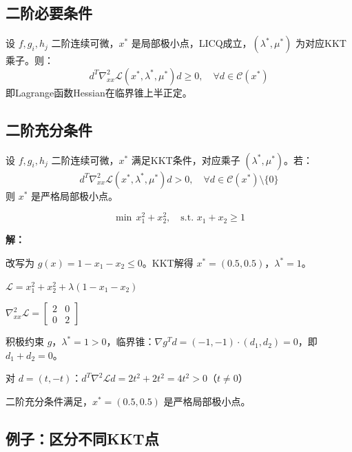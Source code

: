 \subsection{二阶必要条件}

\begin{theorem}[二阶必要条件]
设 $f, g_i, h_j$ 二阶连续可微，$x^*$ 是局部极小点，LICQ成立，$(\lambda^*, \mu^*)$ 为对应KKT乘子。则：
\[
d^T \nabla_{xx}^2 \mathcal{L}(x^*, \lambda^*, \mu^*) d \geq 0, \quad \forall d \in \mathcal{C}(x^*)
\]
即Lagrange函数Hessian在临界锥上半正定。
\end{theorem}

\subsection{二阶充分条件}

\begin{theorem}[二阶充分条件]
设 $f, g_i, h_j$ 二阶连续可微，$x^*$ 满足KKT条件，对应乘子 $(\lambda^*, \mu^*)$。若：
\[
d^T \nabla_{xx}^2 \mathcal{L}(x^*, \lambda^*, \mu^*) d > 0, \quad \forall d \in \mathcal{C}(x^*) \setminus \{0\}
\]
则 $x^*$ 是严格局部极小点。
\end{theorem}

\begin{example}[二阶条件验证]
\[
\min \, x_1^2 + x_2^2, \quad \text{s.t. } x_1 + x_2 \geq 1
\]

\textbf{解：}

改写为 $g(x) = 1 - x_1 - x_2 \leq 0$。KKT解得 $x^* = (0.5, 0.5)$，$\lambda^* = 1$。

$\mathcal{L} = x_1^2 + x_2^2 + \lambda(1 - x_1 - x_2)$

$\nabla^2_{xx} \mathcal{L} = \begin{bmatrix} 2 & 0 \\ 0 & 2 \end{bmatrix}$

积极约束 $g$，$\lambda^* = 1 > 0$，临界锥：$\nabla g^T d = (-1,-1) \cdot (d_1, d_2) = 0$，即 $d_1 + d_2 = 0$。

对 $d = (t, -t)$：$d^T \nabla^2 \mathcal{L} d = 2t^2 + 2t^2 = 4t^2 > 0$（$t \neq 0$）

二阶充分条件满足，$x^* = (0.5, 0.5)$ 是严格局部极小点。
\end{example}

\subsection{例子：区分不同KKT点}

